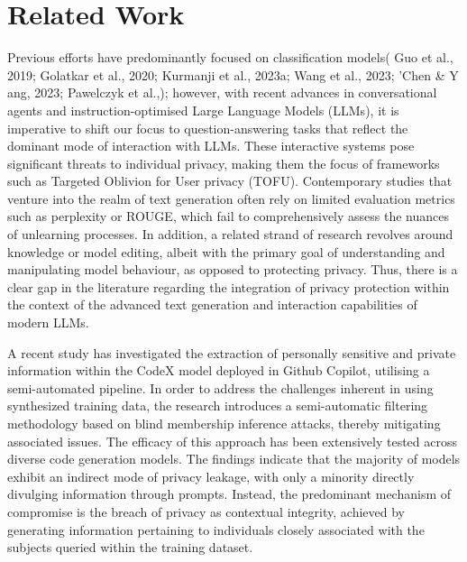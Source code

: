 \section{Related Work}
\label{sec:relatedWork}

Previous efforts have predominantly focused on classification models( Guo et al., 2019;
Golatkar et al., 2020; Kurmanji et al., 2023a; Wang et al., 2023; ’Chen \& Y ang, 2023; Pawelczyk et al.,); however, with recent advances in conversational agents and instruction-optimised Large Language Models (LLMs), it is imperative to shift our focus to question-answering tasks that reflect the dominant mode of interaction with LLMs. These interactive systems pose significant threats to individual privacy, making them the focus of frameworks such as Targeted Oblivion for User privacy (TOFU).
Contemporary studies that venture into the realm of text generation often rely on limited evaluation metrics such as perplexity or ROUGE, which fail to comprehensively assess the nuances of unlearning processes. In addition, a related strand of research revolves around knowledge or model editing, albeit with the primary goal of understanding and manipulating model behaviour, as opposed to protecting privacy. Thus, there is a clear gap in the literature regarding the integration of privacy protection within the context of the advanced text generation and interaction capabilities of modern LLMs.



A recent study has investigated the extraction of personally sensitive and private information within the CodeX model deployed in Github Copilot, utilising a semi-automated pipeline. In order to address the challenges inherent in using synthesized training data, the research introduces a semi-automatic filtering methodology based on blind membership inference attacks, thereby mitigating associated issues. The efficacy of this approach has been extensively tested across diverse code generation models. The findings indicate that the majority of models exhibit an indirect mode of privacy leakage, with only a minority directly divulging information through prompts. Instead, the predominant mechanism of compromise is the breach of privacy as contextual integrity, achieved by generating information pertaining to individuals closely associated with the subjects queried within the training dataset.

